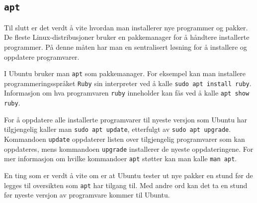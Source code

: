 \begin{alphasection}
\cprotect\subsection{\lstinline{apt}}

Til slutt er det verdt å vite hvordan man installerer nye programmer og pakker. De fleste Linux-distribusjoner bruker en pakkemanager for å håndtere installerte programmer. På denne måten har man en sentralisert løsning for å installere og oppdatere programvarer. 

I Ubuntu bruker man \verb|apt| som pakkemanager. For eksempel kan man installere programmeringsspråket \verb|Ruby| sin interpreter ved å kalle \verb|sudo apt install ruby|. Informasjon om hva programvaren \verb|ruby| inneholder kan fås ved å kalle \verb|apt show ruby|.

For å oppdatere alle installerte programvarer til nyeste versjon som Ubuntu har tilgjengelig kaller man \verb|sudo apt update|, etterfulgt av \verb|sudo apt upgrade|. Kommandoen \verb|update| oppdaterer listen over tilgjengelig programvarer som kan oppdateres, mens kommandoen \verb|upgrade| installerer de nyeste oppdateringene. For mer informasjon om hvilke kommandoer \verb|apt| støtter kan man kalle \verb|man apt|.

En ting som er verdt å vite om er at Ubuntu tester ut nye pakker en stund før de legges til oversikten som \verb|apt| har tilgang til. Med andre ord kan det ta en stund før nyeste versjon av programvare kommer til Ubuntu. 



\end{alphasection}

\setcounter{section}{0}